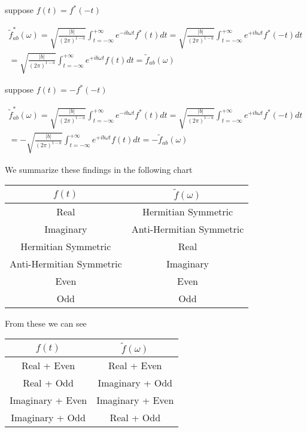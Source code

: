 \documentclass[12pt]{article}
\begin{document}
suppose $f(t) = f^*(-t)$

\begin{align}
\tilde{f}^*_{ab}(\omega) = \sqrt{\frac{|b|}{(2\pi)^{1-a}}}\int_{t=-\infty}^{+\infty} e^{-ib\omega t} f^*(t) dt 
= \sqrt{\frac{|b|}{(2\pi)^{1-a}}}\int_{t=-\infty}^{+\infty} e^{+ib\omega t} f^*(-t) dt \\
= \sqrt{\frac{|b|}{(2\pi)^{1-a}}}\int_{t=-\infty}^{+\infty} e^{+ib\omega t} f(t) dt   = \tilde{f}_{ab}(\omega)
\end{align}

suppose $f(t) = -f^*(-t)$

\begin{align}
\tilde{f}^*_{ab}(\omega) = \sqrt{\frac{|b|}{(2\pi)^{1-a}}}\int_{t=-\infty}^{+\infty} e^{-ib\omega t} f^*(t) dt 
= \sqrt{\frac{|b|}{(2\pi)^{1-a}}}\int_{t=-\infty}^{+\infty} e^{+ib\omega t} f^*(-t) dt \\
= -\sqrt{\frac{|b|}{(2\pi)^{1-a}}}\int_{t=-\infty}^{+\infty} e^{+ib\omega t} f(t) dt   = -\tilde{f}_{ab}(\omega)
\end{align}

We summarize these findings in the following chart

\begin{center}
\begin{tabular}{|c|c|}
\hline
$f(t)$ & $\tilde{f}(\omega)$ \\
\hline
Real & Hermitian Symmetric \\
\hline
Imaginary & Anti-Hermitian Symmetric\\
\hline
Hermitian Symmetric & Real\\
\hline
Anti-Hermitian Symmetric & Imaginary\\
\hline
Even & Even\\
\hline
Odd & Odd\\
\hline
\end{tabular}
\end{center}

From these we can see

\begin{center}
	\begin{tabular}{|c|c|}
		\hline
		$f(t)$ & $\tilde{f}(\omega)$ \\
		\hline
		Real + Even & Real + Even \\
		\hline
		Real + Odd & Imaginary + Odd\\
		\hline
		Imaginary + Even & Imaginary + Even\\
		\hline
		Imaginary + Odd & Real + Odd\\		
		\hline
	\end{tabular}
\end{center}
\end{document}
